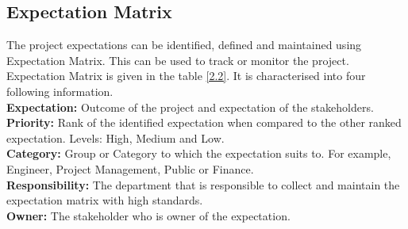 \documentclass[a4paper,table]{article}
\begin{document}
\subsection{Expectation Matrix}
The project expectations can be identified, defined and maintained using Expectation Matrix. This can be used to track or monitor the project. Expectation Matrix is given in the table \ref{2.2}. It is characterised into four following information.\bigskip \\
\textbf{Expectation:} Outcome of the project and expectation of the stakeholders. \\
\textbf{Priority:} Rank of the identified expectation when compared to the other ranked expectation. Levels: High, Medium and Low. \\
\textbf{Category:} Group or Category to which the expectation suits to. For example, Engineer, Project Management, Public or Finance. \\
\textbf{Responsibility:} The department that is responsible to collect and maintain the expectation matrix with high standards. \\
\textbf{Owner:} The stakeholder who is owner of the expectation. 
\end{document}

